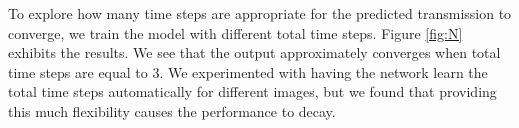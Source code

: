 \documentclass[10pt,twocolumn,letterpaper]{article}
\begin{document}
To explore how many time steps are appropriate for the predicted transmission to converge, we train the model with different total time steps. Figure \ref{fig:N} exhibits the results. We see that the output approximately converges when total time steps are equal to 3. We experimented with having the network learn the total time steps automatically for different images, but we found that providing this much flexibility causes the performance to decay.
\begin{table}[!t]
    \centering
    \caption{Ablation study of IBCLN for loss terms on three testing sets. Each loss contributes to IBCLN's performance, and combining all achieves the best result.}
    \footnotesize
    \vspace{2pt}
    \vspace{-1.5em}    
    \label{tb:loss}
\end{table}
\end{document}

